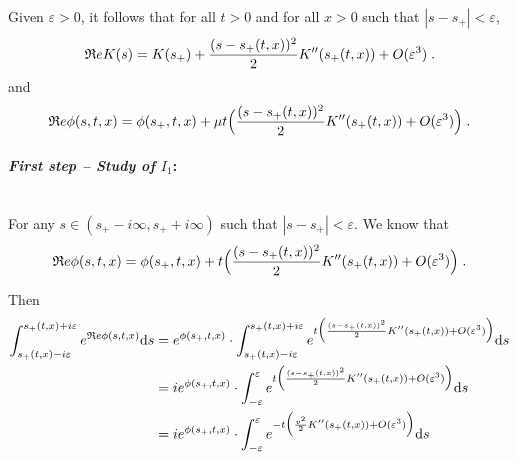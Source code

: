 \documentclass[11pt]{amsart}
\renewcommand{\Re}{\mathfrak{R}e}
\begin{document}
Given $\varepsilon > 0$, it follows that for all $t > 0$ and for all $x>0$ such that $|s - s_+| < \varepsilon$, 
    \begin{equation}
        \begin{split}
        \Re K(s) = K(s_+) + \frac{(s - s_+(t,x))^2}{2} K''(s_+(t,x)) + O(\varepsilon^3)
        \eqfinp
        \end{split}
    \end{equation}
and 
    \begin{equation}
        \Re \phi(s, t, x) = \phi(s_+, t, x) + \mu t \Big(\frac{(s - s_+(t,x))^2}{2} K''(s_+(t,x)) + O(\varepsilon^3)\Big)
        \eqfinp
    \end{equation}
\medskip

\paragraph{\textit{First step -- Study of $I_1$}:}\mbox{}\\
For any $s \in (s_+ - i \infty, s_+ + i \infty)$ such that $|s - s_+| < \varepsilon$.
We know that 
    \begin{equation}
        \Re \phi(s, t, x) = \phi(s_+, t, x) + t \Big(\frac{(s - s_+(t,x))^2}{2} K''(s_+(t,x)) + O(\varepsilon^3)\Big)
        \eqfinp
    \end{equation}

Then 
\begin{align*}
   \int_{s_+(t,x) - i\varepsilon}^{s_+(t,x) + i\varepsilon} e^{\Re \phi(s,t,x)} \ds
    &=
    e^{\phi(s_+, t, x)} \cdot \int_{s_+(t,x) - i\varepsilon}^{s_+(t,x) + i\varepsilon} e^{t \Big(\frac{(s - s_+(t,x))^2}{2} K''(s_+(t,x)) + O(\varepsilon^3)\Big)} \ds \\
    &= 
     i e^{\phi(s_+, t, x)} \cdot \int_{- \varepsilon}^{\varepsilon} e^{t \Big(\frac{(s - s_+(t,x))^2}{2} K''(s_+(t,x)) + O(\varepsilon^3)\Big)} \ds \\
    &= 
     i e^{\phi(s_+, t, x)} \cdot \int_{- \varepsilon}^{\varepsilon} e^{- t \Big(\frac{v^2}{2} K''(s_+(t,x)) + O(\varepsilon^3)\Big)} \ds 
\end{align*}
\end{document}
